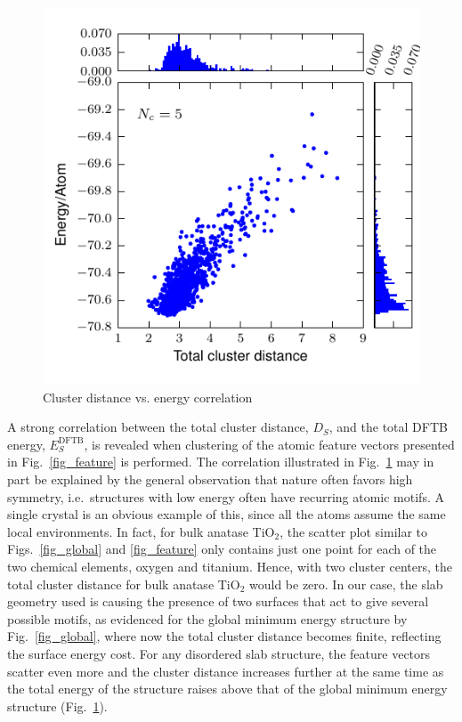 \documentclass[aip,amsmath,amssymb,reprint]{revtex4-1}
\begin{document}
\begin{figure}[tb]
    \centering
    \includegraphics[width=1.0\columnwidth]{fig4-correlation.pdf}
    \caption{Cluster distance vs. energy correlation}
    \label{fig_corr}
\end{figure}

A strong correlation between the total
cluster distance, $D_S$, and the total DFTB energy,
$E_S^\mathrm{DFTB}$, is revealed when
clustering of the atomic feature vectors presented in
Fig.\  \ref{fig_feature} is performed. The correlation illustrated in
Fig.\  \ref{fig_corr} may in part be explained by the
general observation that nature often favors high
symmetry\cite{pickard2011}, i.e.\ structures with low energy often have
recurring atomic motifs. A single crystal is an obvious example of
this, since all the atoms assume the same local
environments. In fact, for bulk anatase TiO$_2$, the scatter plot similar to
Figs.\  \ref{fig_global} and \ref{fig_feature} only contains just one point
for each of the two chemical elements, oxygen and titanium. Hence, with
two cluster centers, the total cluster distance for bulk anatase TiO$_2$ would be zero. In our
case, the slab geometry used is causing the presence of two surfaces
that act to give several possible motifs, as evidenced for the global
minimum energy structure by Fig.\  \ref{fig_global}, where now the total cluster
distance becomes finite, reflecting the surface energy cost. For any
disordered slab structure, the feature vectors scatter even more and the cluster distance increases
further at the same time as the total energy of the structure
raises above that of the global minimum energy structure (Fig.\  \ref{fig_corr}).
\end{document}
